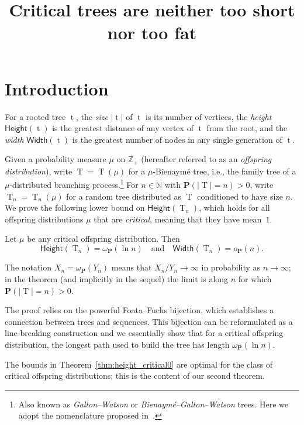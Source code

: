 \documentclass[AHL,Unicode,longabstracts,published]{cedram}
\title[Critical trees are neither too short nor too fat]{Critical trees are neither too short nor too fat}
\author[\initial{L.} \lastname{Addario-Berry}]{\firstname{Louigi} \lastname{Addario-Berry}}
\author[\initial{S.} \lastname{Donderwinkel}]{\firstname{Serte} \lastname{Donderwinkel}}
\author[\initial{I.} \lastname{Kortchemski}]{\firstname{Igor} \lastname{Kortchemski}}
\newcommand{\Z}{\mathbb{Z}}
\newcommand{\N}{\mathbb{N}}
\renewcommand{\H}{\mathsf{Height}}
\newcommand{\p}{\mathbf{P}}
\newcommand{\Width}{\mathsf{Width}}
\DeclareMathOperator{\tree}{t}
\DeclareMathOperator{\rtree}{T}
\begin{document}
\maketitle



\section{Introduction}

For a rooted tree $\tree$, the \emph{size} $|\tree|$ of $\tree$ is its number of vertices, the \emph{height} $\H(\tree)$ is the greatest distance of any vertex of $\tree$ from the root, and the \emph{width} $\Width(\tree)$ is the greatest number of nodes in any single generation of $\tree$.

Given a probability measure $\mu$ on $\Z_{+}$ (hereafter referred to as an \emph{offspring distribution}), write $\rtree=\rtree(\mu)$ for a $\mu$-Bienaymé tree, i.e., the family tree of a $\mu$-distributed branching process.\footnote{Also known as \emph{Galton--Watson} or \emph{Bienaymé--Galton--Watson} trees. Here we adopt the nomenclature proposed in~\cite{ABHK21}.} For $n \in \N$ with $\p(|\rtree|=n)>0$, write $\rtree_n=\rtree_n(\mu)$ for a random tree distributed as $\rtree$ conditioned to have size $n$. We prove the following lower bound on $\H(\rtree_n)$, which holds for all offspring distributions $\mu$ that are \emph{critical}, meaning that they have mean~$1$.
\begin{theo}\label{thm:height_critical0}
Let $\mu$ be any critical offspring distribution. Then
\[
\H(\rtree_{n}) = \omega_{\p}(\ln n)
\quad \text{and} \quad
\Width(\rtree_n)=o_{\p}(n).
\]
\end{theo}

The notation $X_n = \omega_{\p}(Y_n)$ means that $X_n/Y_n \to \infty$ in probability as $n \to \infty$; in the theorem (and implicitly in the sequel) the limit is along $n$ for which $\p(|\rtree|=n)>0$.

The proof relies on the powerful Foata--Fuchs bijection, which establishes a connection between trees and sequences. This bijection can be reformulated as a line-breaking construction and we essentially show that for a critical offspring distribution, the longest path used to build the tree has length $\omega_{\p}(\ln n)$.

The bounds in Theorem~\ref{thm:height_critical0} are optimal for the class of critical offspring distributions; this is the content of our second theorem.
\end{document}
